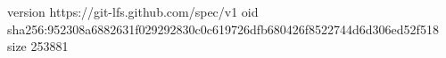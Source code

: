 version https://git-lfs.github.com/spec/v1
oid sha256:952308a6882631f029292830c0c619726dfb680426f8522744d6d306ed52f518
size 253881
